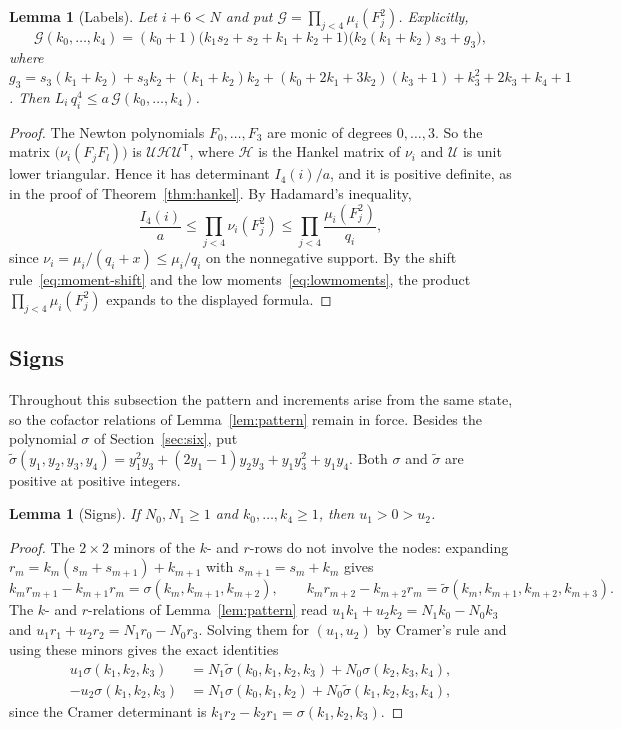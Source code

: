 \documentclass[11pt]{article}
\newtheorem{lemma}[theorem]{Lemma}
\theoremstyle{definition}
\theoremstyle{remark}
\begin{document}
\begin{lemma}[Labels]\label{lem:labels}
Let $i+6<N$ and put $\mathcal G=\prod_{j<4}\mu_i(F_j^2)$. Explicitly,
\[
\mathcal G(k_0,\dots,k_4)=(k_0+1)\bigl(k_1s_2+s_2+k_1+k_2+1\bigr)
\bigl(k_2(k_1+k_2)s_3+g_3\bigr),
\]
where $g_3=s_3(k_1+k_2)+s_3k_2+(k_1+k_2)k_2+(k_0+2k_1+3k_2)(k_3+1)+k_3^2+2k_3+k_4+1$. Then
$L_i\,q_i^4\le a\,\mathcal G(k_0,\dots,k_4)$.
\end{lemma}

\begin{proof}
The Newton polynomials $F_0,\dots,F_3$ are monic of degrees $0,\dots,3$. So the matrix
$\bigl(\nu_i(F_jF_l)\bigr)$ is $\mathcal U\mathcal H\mathcal U^{\mathsf T}$, where $\mathcal H$ is the Hankel matrix of $\nu_i$ and $\mathcal U$ is unit
lower triangular. Hence it has determinant $I_4(i)/a$, and it is positive definite, as in the
proof of Theorem~\ref{thm:hankel}. By Hadamard's inequality,
\[
\frac{I_4(i)}a\le\prod_{j<4}\nu_i(F_j^2)\le\prod_{j<4}\frac{\mu_i(F_j^2)}{q_i},
\]
since $\nu_i=\mu_i/(q_i+x)\le\mu_i/q_i$ on the nonnegative support. By the shift
rule~\eqref{eq:moment-shift} and the low moments~\eqref{eq:lowmoments}, the product
$\prod_{j<4}\mu_i(F_j^2)$ expands to the displayed formula.
\end{proof}

\subsection{Signs}\label{sec:signs}
Throughout this subsection the pattern and increments arise from the same state,
so the cofactor relations of Lemma~\ref{lem:pattern} remain in force.
Besides the polynomial $\sigma$ of Section~\ref{sec:six}, put
$\tilde\sigma(y_1,y_2,y_3,y_4)=y_1^2y_3+(2y_1-1)y_2y_3+y_1y_3^2+y_1y_4$. Both $\sigma$
and $\tilde\sigma$ are positive at positive integers.

\begin{lemma}[Signs]\label{lem:signs}
If $N_0,N_1\ge1$ and $k_0,\dots,k_4\ge1$, then $u_1>0>u_2$.
\end{lemma}

\begin{proof}
The $2\times2$ minors of the $k$- and $r$-rows do not involve the nodes: expanding
$r_m=k_m(s_m+s_{m+1})+k_{m+1}$ with $s_{m+1}=s_m+k_m$ gives
\[
 k_mr_{m+1}-k_{m+1}r_m=\sigma(k_m,k_{m+1},k_{m+2}),\qquad
 k_mr_{m+2}-k_{m+2}r_m=\tilde\sigma(k_m,k_{m+1},k_{m+2},k_{m+3}).
\]
The $k$- and $r$-relations of Lemma~\ref{lem:pattern} read
$u_1k_1+u_2k_2=N_1k_0-N_0k_3$ and $u_1r_1+u_2r_2=N_1r_0-N_0r_3$. Solving them for
$(u_1,u_2)$ by Cramer's rule and using these minors gives the exact identities
\begin{align*}
u_1\sigma(k_1,k_2,k_3)&=N_1\tilde\sigma(k_0,k_1,k_2,k_3)+N_0\sigma(k_2,k_3,k_4),\\
-u_2\sigma(k_1,k_2,k_3)&=N_1\sigma(k_0,k_1,k_2)+N_0\tilde\sigma(k_1,k_2,k_3,k_4),
\end{align*}
since the Cramer determinant is $k_1r_2-k_2r_1=\sigma(k_1,k_2,k_3)$.
\end{proof}
\end{document}
